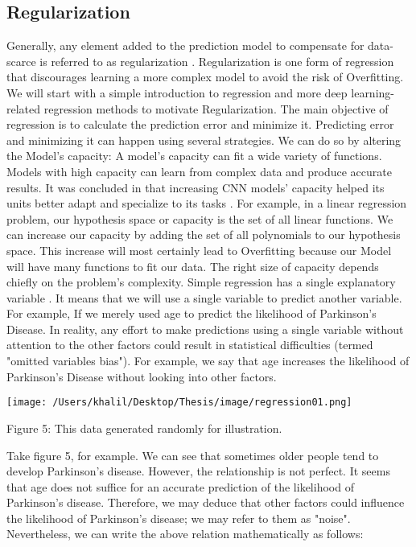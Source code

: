\documentclass[oneside,12pt,article]{article}
\begin{document}
\subsection{Regularization}
Generally, any element added to the prediction model to compensate for data-scarce is referred to as regularization \cite{moradi2020survey}. Regularization is one form of regression that discourages learning a more complex model to avoid the risk of Overfitting. We will start with a simple introduction to regression and more deep learning-related regression methods to motivate Regularization. The main objective of regression is to calculate the prediction error and minimize it. Predicting error and minimizing it can happen using several strategies. We can do so by altering the Model's capacity: A model's capacity can fit a wide variety of functions. Models with high capacity can learn from complex data and produce accurate results. It was concluded in \cite{wang2017growing} that increasing CNN models' capacity helped its units better adapt and specialize to its tasks \cite{bengio2017deep}. For example, in a linear regression problem, our hypothesis space or capacity is the set of all linear functions. We can increase our capacity by adding the set of all polynomials to our hypothesis space. This increase will most certainly lead to Overfitting because our Model will have many functions to fit our data. The right size of capacity depends chiefly on the problem's complexity. Simple regression has a single explanatory variable \cite{sykes1993introduction}. It means that we will use a single variable to predict another variable. For example, If we merely used age to predict the likelihood of Parkinson's Disease. In reality, any effort to make predictions using a single variable without attention to the other factors could result in statistical difficulties (termed "omitted variables bias"). For example, we say that age increases the likelihood of Parkinson's Disease without looking into other factors. 

 \begin{center}
\texttt{[image: /Users/khalil/Desktop/Thesis/image/regression01.png]} 
\newline
\begin{center}
Figure 5: This data generated randomly for illustration. 
\end{center}
\end{center}

Take figure 5, for example. We can see that sometimes older people tend to develop Parkinson's disease. However, the relationship is not perfect. It seems that age does not suffice for an accurate prediction of the likelihood of Parkinson's disease. Therefore, we may deduce that other factors could influence the likelihood of Parkinson's disease; we may refer to them as "noise". Nevertheless, we can write the above relation mathematically as follows:
   
\end{document}
